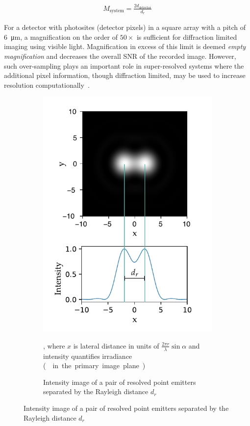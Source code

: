 \begin{align}
    M_\text{system} = \frac{2d_\text{detector}}{d_r}
\end{align}

For a detector with \gls{photosite}s (detector pixels) in a square array with a pitch of \SI{6}{\micro\meter}, a magnification on the order of \(50\times\) is sufficient for diffraction limited imaging using visible light.
Magnification in excess of this limit is deemed \emph{empty magnification} and decreases the overall \gls{SNR} of the recorded image.
However, such over-sampling plays an important role in super-resolved systems where the additional pixel information, though diffraction limited, may be used to increase resolution computationally~\cite{betzigImagingIntracellularFluorescent2006}.
\pagebreak
\begin{figure}
    \centering
    \begin{subfigure}[b]{\textwidth}
        \centering
        \includegraphics{./sampling/sample_master}
        \caption{Intensity image of a pair of resolved point emitters separated by the Rayleigh distance $d_{r}$}, where \(x\) is lateral distance in units of \(\frac{2\pi r }{\lambda}\sin {\alpha}\) and intensity quantifies irradiance (\SI{}{\watt\per\meter\square} in the primary image plane.)
        \label{fig:sample_master}
    \end{subfigure}
\end{figure}
